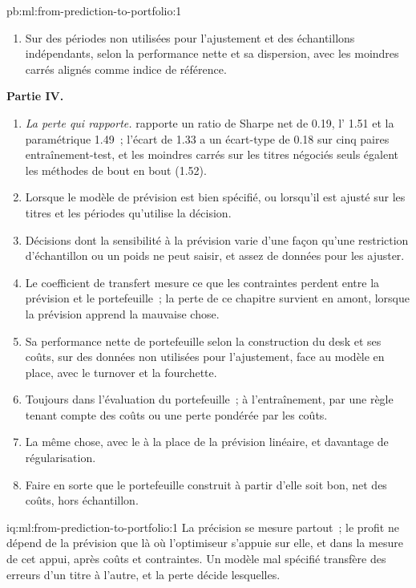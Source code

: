 \begin{solution}{pb:ml:from-prediction-to-portfolio:1}
\begin{enumerate}[resume]
\item Sur des périodes non utilisées pour l'ajustement et des échantillons indépendants, selon la performance nette et sa dispersion, avec les moindres carrés alignés comme
indice de référence.
\end{enumerate}
\textbf{Partie IV.}
\begin{enumerate}[resume]
\item \emph{La perte qui rapporte.}  rapporte un ratio de Sharpe net de 0.19, l' 1.51 et la
 paramétrique 1.49~; l'écart de 1.33 a un écart-type de 0.18 sur cinq paires entraînement-test, et les moindres carrés sur les
titres négociés seuls égalent les méthodes de bout en bout (1.52).
\item Lorsque le modèle de prévision est bien spécifié, ou lorsqu'il est ajusté sur les titres et les périodes qu'utilise la décision.
\item Décisions dont la sensibilité à la prévision varie d'une façon qu'une restriction d'échantillon ou un poids ne peut saisir, et assez de données
pour les ajuster.
\item Le coefficient de transfert mesure ce que les contraintes perdent entre la prévision et le portefeuille~; la perte de ce chapitre survient
en amont, lorsque la prévision apprend la mauvaise chose.
\item Sa performance nette de portefeuille selon la construction du desk et ses coûts, sur des données non utilisées pour l'ajustement, face au modèle en place, avec
le turnover et la fourchette.
\item Toujours dans l'évaluation du portefeuille~; à l'entraînement, par une règle tenant compte des coûts ou une perte pondérée par les coûts.
\item La même chose, avec le  à la place de la prévision linéaire, et davantage de régularisation.
\item Faire en sorte que le portefeuille construit à partir d'elle soit bon, net des coûts, hors échantillon.
\end{enumerate}
\end{solution}

\begin{solution}{iq:ml:from-prediction-to-portfolio:1}
La précision se mesure partout~; le profit ne dépend de la prévision que là où l'optimiseur s'appuie sur elle, et dans la mesure de cet appui, après
coûts et contraintes. Un modèle mal spécifié transfère des erreurs d'un titre à l'autre, et la perte décide lesquelles.
\end{solution}

